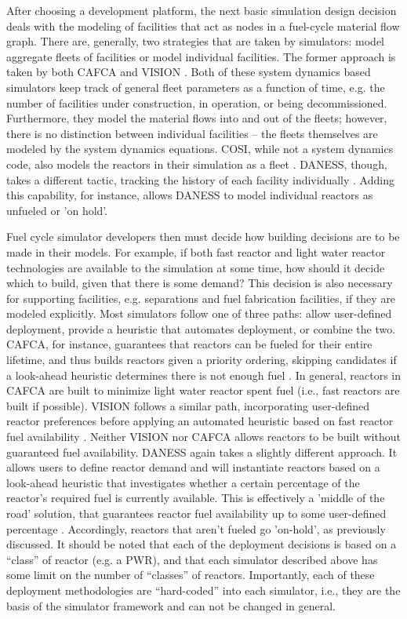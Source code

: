 After choosing a development platform, the next basic simulation design decision
deals with the modeling of facilities that act as nodes in a fuel-cycle material
flow graph. There are, generally, two strategies that are taken by simulators:
model aggregate fleets of facilities or model individual facilities. The former
approach is taken by both CAFCA and
VISION \cite{busquim_e_silva_system_2008,schweitzer_improved_2008}. Both of
these system dynamics based simulators keep track of general fleet parameters as
a function of time, e.g. the number of facilities under construction, in
operation, or being decommissioned. Furthermore, they model the material flows
into and out of the fleets; however, there is no distinction between individual
facilities -- the fleets themselves are modeled by the system dynamics
equations. COSI, while not a system dynamics code, also models the reactors in
their simulation as a fleet \cite{coquelet-pascal_validation_2011}. DANESS,
though, takes a different tactic, tracking the history of each facility
individually \cite{durpel_daness_2003}. Adding this capability, for instance,
allows DANESS to model individual reactors as unfueled or 'on hold'. 

Fuel cycle simulator developers then must decide how building decisions are to
be made in their models. For example, if both fast reactor and light water
reactor technologies are available to the simulation at some time, how should it
decide which to build, given that there is some demand? This decision is also
necessary for supporting facilities, e.g. separations and fuel fabrication
facilities, if they are modeled explicitly. Most simulators follow one of three
paths: allow user-defined deployment, provide a heuristic that automates
deployment, or combine the two. CAFCA, for instance, guarantees that reactors
can be fueled for their entire lifetime, and thus builds reactors given a
priority ordering, skipping candidates if a look-ahead heuristic determines
there is not enough fuel \cite{busquim_e_silva_system_2008}. In general,
reactors in CAFCA are built to minimize light water reactor spent fuel (i.e.,
fast reactors are built if possible). VISION follows a similar path,
incorporating user-defined reactor preferences before applying an automated
heuristic based on fast reactor fuel
availability \cite{schweitzer_improved_2008}. Neither VISION nor CAFCA allows
reactors to be built without guaranteed fuel availability. DANESS again takes a
slightly different approach. It allows users to define reactor demand and will
instantiate reactors based on a look-ahead heuristic that investigates whether a
certain percentage of the reactor's required fuel is currently available. This
is effectively a 'middle of the road' solution, that guarantees reactor fuel
availability up to some user-defined
percentage \cite{guerin_benchmark_2009}. Accordingly, reactors that aren't
fueled go 'on-hold', as previously discussed. It should be noted that each of
the deployment decisions is based on a ``class'' of reactor (e.g. a PWR), and
that each simulator described above has some limit on the number of ``classes''
of reactors. Importantly, each of these deployment methodologies are
``hard-coded'' into each simulator, i.e., they are the basis of the simulator
framework and can not be changed in general.

